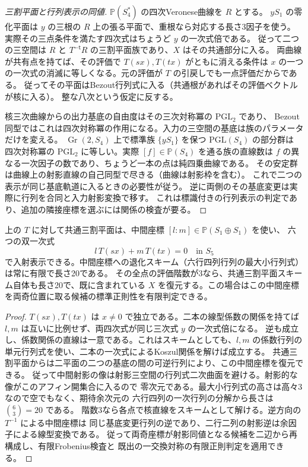 \begin{proof}[三割平面と行列表示の同値]
$\mathbb P(S_4^*)$ の四次Veronese曲線を $R$ とする。
$yS_1$ の零化平面は $y$ の三根の $R$ 上の張る平面で、重根なら対応する長さ3因子を使う。
実際その三点条件を満たす四次式はちょうど $y$ の一次式倍である。
従って二つの三空間は $R$ と $T^{-\mathsf t}R$ の三割平面族であり、$X$ はその共通部分に入る。
両曲線が共有点を持てば、その評価で $T(sx),T(tx)$ がともに消える条件は
$x$ の一つの一次式の消滅に等しくなる。元の評価が $T$ の引戻しでも一点評価だからである。
従ってその平面はBezout行列式に入る（共通根があればその評価ベクトルが核に入る）。
整な八次という仮定に反する。

核三次曲線からの出力基底の自由度はその三次対称冪の $\mathrm{PGL}_2$ であり、
Bezout同型ではこれは四次対称冪の作用になる。入力の三空間の基底は族のパラメータだけを変える。
$\operatorname{Gr}(2,S_4)$ 上で標準族 $\{yS_1\}$ を保つ $\mathrm{PGL}(S_4)$ の部分群は
四次対称冪の $\mathrm{PGL}_2$ に等しい。実際 $[f]\in\mathbb P(S_4)$ を通る族の直線数は
$f$ の異なる一次因子の数であり、ちょうど一本の点は純四乗曲線である。
その安定群は曲線上の射影直線の自己同型で尽きる（曲線は射影枠を含む）。
これで二つの表示が同じ基底軌道に入るときの必要性が従う。
逆に両側のその基底変更は実際に行列を合同と入力射影変換で移す。
これは標識付きの行列表示の判定であり、追加の隣接座標を選ぶには関係の検査が要る。
\end{proof}

\begin{corollary}\label{cor:trisecant-middle-edge}
上の $T$ に対して共通三割平面は、中間座標 $[l:m]\in\mathbb P(S_1\oplus S_1)$ を使い、
六つの双一次式
\[
                  l\,T(sx)+m\,T(tx)=0\quad\text{in } S_5
\]
で入射表示できる。中間座標への退化スキーム（六行四列行列の最大小行列式）は常に有限で長さ20である。
その全点の評価階数が3なら、共通三割平面スキーム自体も長さ20で、既に含まれている
$X$ を復元する。この場合はこの中間座標を両奇位置に取る候補の標準正則性を有限判定できる。
\end{corollary}
\begin{proof}
$T(sx),T(tx)$ は $x\ne0$ で独立である。二本の線型係数の関係を持てば
$l,m$ は互いに比例せず、両四次式が同じ三次式 $y$ の一次式倍になる。
逆も成立し、係数関係の直線は一意である。これはスキームとしても、$l,m$ の係数行列の
単元行列式を使い、二本の一次式によるKoszul関係を解けば成立する。
共通三割平面からは二平面の二つの基底の間の可逆行列により、この中間座標を復元できる。
従って中間射影の像は射影三空間の行列式二次曲面を避ける。射影的な像がこのアフィン開集合に入るので
零次元である。最大小行列式の高さは高々3なので空でもなく、期待余次元の
六行四列の一次行列の分解から長さは $\binom63=20$ である。
階数3なら各点で核直線をスキームとして解ける。逆方向の $T^{-1}$ による中間座標は
同じ基底変更行列の逆であり、二行二列の射影逆は余因子による線型変換である。
従って両奇座標が射影同値となる候補を二辺から再構成し、有限Frobenius検査と
既出の一交換対称の有限正則判定を適用できる。
\end{proof}

